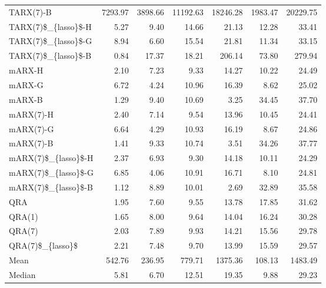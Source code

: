 \begin{tabular}{lrrrrrr}
TARX(7)-B           &  7293.97 &  3898.66 &      11192.63 &  18246.28 &  1983.47 &      20229.75 \\
TARX(7)\$\_\{lasso\}\$-H &     5.27 &     9.40 &         14.66 &     21.13 &    12.28 &         33.41 \\
TARX(7)\$\_\{lasso\}\$-G &     8.94 &     6.60 &         15.54 &     21.81 &    11.34 &         33.15 \\
TARX(7)\$\_\{lasso\}\$-B &     0.84 &    17.37 &         18.21 &    206.14 &    73.80 &        279.94 \\
mARX-H              &     2.10 &     7.23 &          9.33 &     14.27 &    10.22 &         24.49 \\
mARX-G              &     6.72 &     4.24 &         10.96 &     16.39 &     8.62 &         25.02 \\
mARX-B              &     1.29 &     9.40 &         10.69 &      3.25 &    34.45 &         37.70 \\
mARX(7)-H           &     2.40 &     7.14 &          9.54 &     13.96 &    10.45 &         24.41 \\
mARX(7)-G           &     6.64 &     4.29 &         10.93 &     16.19 &     8.67 &         24.86 \\
mARX(7)-B           &     1.41 &     9.33 &         10.74 &      3.51 &    34.26 &         37.77 \\
mARX(7)\$\_\{lasso\}\$-H &     2.37 &     6.93 &          9.30 &     14.18 &    10.11 &         24.29 \\
mARX(7)\$\_\{lasso\}\$-G &     6.85 &     4.06 &         10.91 &     16.71 &     8.10 &         24.81 \\
mARX(7)\$\_\{lasso\}\$-B &     1.12 &     8.89 &         10.01 &      2.69 &    32.89 &         35.58 \\
QRA                 &     1.95 &     7.60 &          9.55 &     13.78 &    17.85 &         31.62 \\
QRA(1)              &     1.65 &     8.00 &          9.64 &     14.04 &    16.24 &         30.28 \\
QRA(7)              &     2.03 &     7.89 &          9.93 &     14.21 &    15.56 &         29.78 \\
QRA(7)\$\_\{lasso\}\$    &     2.21 &     7.48 &          9.70 &     13.99 &    15.59 &         29.57 \\
Mean                &   542.76 &   236.95 &        779.71 &   1375.36 &   108.13 &       1483.49 \\
Median              &     5.81 &     6.70 &         12.51 &     19.35 &     9.88 &         29.23 \\

\end{tabular}
